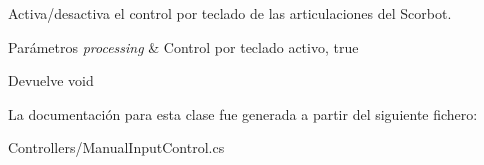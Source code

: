 Activa/desactiva el control por teclado de las articulaciones del Scorbot. 
\begin{DoxyParams}{Parámetros}
{\em processing} & Control por teclado activo, true \\
\hline
\end{DoxyParams}
\begin{DoxyReturn}{Devuelve}
void 
\end{DoxyReturn}


La documentación para esta clase fue generada a partir del siguiente fichero\+:\begin{DoxyCompactItemize}
\item 
Controllers/Manual\+Input\+Control.\+cs\end{DoxyCompactItemize}
